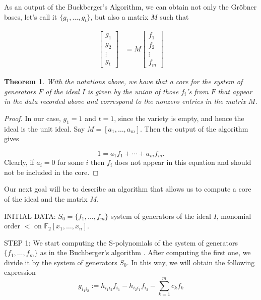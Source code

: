 \documentclass{article}
\theoremstyle{plain}
\newtheorem{thm}[defn]{Theorem} %
\begin{document}
As an output of the Buckberger's Algorithm, we can obtain not only the Gr\"obner bases, let's call it $\{g_1,\ldots,g_t\}$, but also a matrix $M$ such that
\begin{center}
\begin{align}
   \begin{bmatrix}
           g_{1} \\
           g_{2} \\
           \vdots \\
           g_{t}
         \end{bmatrix}
    &= M \begin{bmatrix}
           f_{1} \\
           f_{2} \\
           \vdots \\
           f_{m}
         \end{bmatrix}
  \end{align}

\end{center}
\begin{thm}
With the notations above, we have that a core for the system of generators $F$ of the ideal $I$ is given by the union of those $f_i$'s from $F$ that appear in the data recorded above and correspond to the nonzero entries in the matrix $M$. 
\end{thm}

\begin{proof}
In our case, $g_1=1$ and $t=1$, since the variety is empty, and hence the ideal is the unit ideal. Say $M= [a_1, \ldots, a_m]$. Then the output of the algorithm gives

$$1 = a_1f_1+\cdots + a_m f_m.$$ Clearly, if $a_i=0$ for some $i$ then $f_i$ does not appear in this equation and should not be included in the core.

\end{proof}


%
%

 Our next goal will be to describe an algorithm that allows us to compute a core of the ideal and the matrix $M$.

INITIAL DATA: $S_0=\{f_1,\ldots,f_m\}$ system of generators of the ideal $I$, monomial order $<$ on $\mathbb{F}_2[x_1,\ldots,x_n]$.

STEP 1: We start computing the S-polynomials of the system of generators $\{f_1,\ldots,f_m\}$ as in the Buchberger's algorithm \cite{HH}. After computing the first one, we divide it by the system of generators $S_0$. In this way, we will obtain the following expression
$$g_{i_1i_2}:= h_{i_1i_2}f_{i_1}-h_{i_2i_1}f_{i_2}-\displaystyle\sum_{k=1}^m c_kf_k$$
\end{document}
